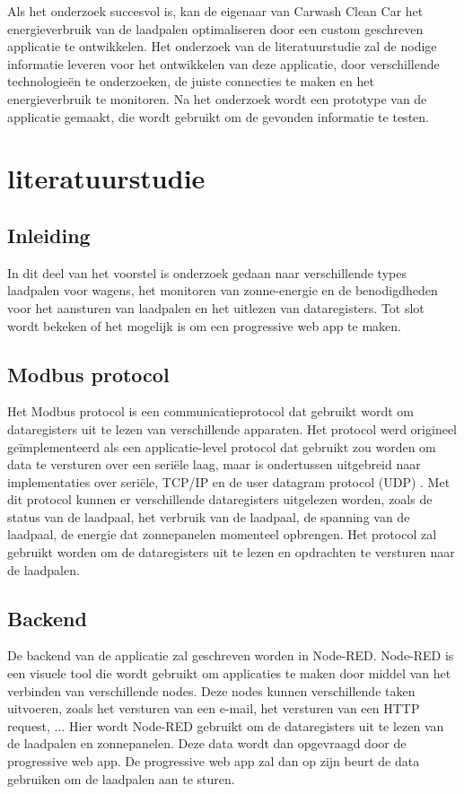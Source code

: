 Als het onderzoek succesvol is, kan de eigenaar van Carwash Clean Car het energieverbruik van de laadpalen optimaliseren door een custom geschreven applicatie te ontwikkelen. Het onderzoek van de literatuurstudie zal de nodige informatie leveren voor het ontwikkelen van deze applicatie, door verschillende technologieën te onderzoeken, de juiste connecties te maken en het energieverbruik te monitoren. Na het onderzoek wordt een prototype van de applicatie gemaakt, die wordt gebruikt om de gevonden informatie te testen.


\section{literatuurstudie}%
\label{sec:literatuurstudie}

\subsection{Inleiding}%
\label{sub:inleiding_literatuurstudie}
In dit deel van het voorstel is onderzoek gedaan naar verschillende types laadpalen voor wagens, het monitoren van zonne-energie en de benodigdheden voor het aansturen van laadpalen en het uitlezen van dataregisters. Tot slot wordt bekeken of het mogelijk is om een progressive web app te maken.

\subsection{Modbus protocol}%
\label{sub:modbus_protocol}
Het Modbus protocol is een communicatieprotocol dat gebruikt wordt om dataregisters uit te lezen van verschillende apparaten. Het protocol werd origineel geïmplementeerd als een applicatie-level protocol dat gebruikt zou worden om data te versturen over een seriële laag, maar is ondertussen uitgebreid naar implementaties over seriële, TCP/IP en de user datagram protocol (UDP) \autocite{NI2023}. Met dit protocol kunnen er verschillende dataregisters uitgelezen worden, zoals de status van de laadpaal, het verbruik van de laadpaal, de spanning van de laadpaal, de energie dat zonnepanelen momenteel opbrengen. Het protocol zal gebruikt worden om de dataregisters uit te lezen en opdrachten te versturen naar de laadpalen.

\subsection{Backend}%
\label{sub:backend}
De backend van de applicatie zal geschreven worden in Node-RED. Node-RED is een visuele tool die wordt gebruikt om applicaties te maken door middel van het verbinden van verschillende nodes. Deze nodes kunnen verschillende taken uitvoeren, zoals het versturen van een e-mail, het versturen van een HTTP request, ... Hier wordt Node-RED gebruikt om de dataregisters uit te lezen van de laadpalen en zonnepanelen. Deze data wordt dan opgevraagd door de progressive web app. De progressive web app zal dan op zijn beurt de data gebruiken om de laadpalen aan te sturen.

